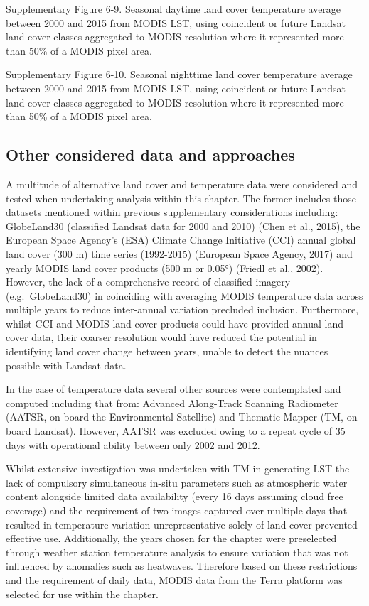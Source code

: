 \documentclass[]{book}
\begin{document}
Supplementary Figure 6-9. Seasonal daytime land cover temperature
average between 2000 and 2015 from MODIS LST, using coincident or future
Landsat land cover classes aggregated to MODIS resolution where it
represented more than 50\% of a MODIS pixel area.

Supplementary Figure 6-10. Seasonal nighttime land cover temperature
average between 2000 and 2015 from MODIS LST, using coincident or future
Landsat land cover classes aggregated to MODIS resolution where it
represented more than 50\% of a MODIS pixel area.

\subsection{Other considered data and
approaches}\label{other-considered-data-and-approaches-2}

A multitude of alternative land cover and temperature data were
considered and tested when undertaking analysis within this chapter. The
former includes those datasets mentioned within previous supplementary
considerations including: GlobeLand30 (classified Landsat data for 2000
and 2010) (Chen et al., 2015), the European Space Agency's (ESA) Climate
Change Initiative (CCI) annual global land cover (300 m) time series
(1992-2015) (European Space Agency, 2017) and yearly MODIS land cover
products (500 m or 0.05°) (Friedl et al., 2002). However, the lack of a
comprehensive record of classified imagery (e.g.~GlobeLand30) in
coinciding with averaging MODIS temperature data across multiple years
to reduce inter-annual variation precluded inclusion. Furthermore,
whilst CCI and MODIS land cover products could have provided annual land
cover data, their coarser resolution would have reduced the potential in
identifying land cover change between years, unable to detect the
nuances possible with Landsat data.

In the case of temperature data several other sources were contemplated
and computed including that from: Advanced Along-Track Scanning
Radiometer (AATSR, on-board the Environmental Satellite) and Thematic
Mapper (TM, on board Landsat). However, AATSR was excluded owing to a
repeat cycle of 35 days with operational ability between only 2002 and
2012.

Whilst extensive investigation was undertaken with TM in generating LST
the lack of compulsory simultaneous in-situ parameters such as
atmospheric water content alongside limited data availability (every 16
days assuming cloud free coverage) and the requirement of two images
captured over multiple days that resulted in temperature variation
unrepresentative solely of land cover prevented effective use.
Additionally, the years chosen for the chapter were preselected through
weather station temperature analysis to ensure variation that was not
influenced by anomalies such as heatwaves. Therefore based on these
restrictions and the requirement of daily data, MODIS data from the
Terra platform was selected for use within the chapter.
\end{document}
